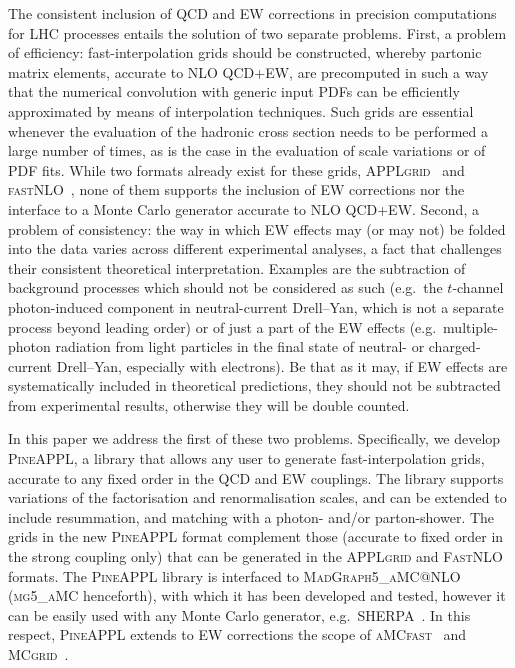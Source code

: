The consistent inclusion of QCD and EW corrections in precision computations for
LHC processes entails
the solution of two separate problems. First, a problem of efficiency:
fast-interpolation grids should be constructed, whereby partonic matrix 
elements, accurate to NLO QCD+EW, are precomputed in such a way that the 
numerical convolution with generic input PDFs can be efficiently approximated
by means of interpolation techniques. Such grids are essential
whenever the evaluation of the hadronic cross section needs to 
be performed a large number of times, as is the case in the evaluation of
scale variations or of PDF fits. While two formats already exist for
these grids, \textsc{APPLgrid}~\cite{Carli:2010rw} and
\textsc{fastNLO}~\cite{Kluge:2006xs,Wobisch:2011ij,Britzger:2012bs}, none of them supports the inclusion of EW
corrections nor the interface to a Monte Carlo generator accurate to 
NLO QCD+EW\@. Second, a problem of consistency: the way in which EW effects may
(or may not) be folded into the data varies across different experimental 
analyses, a fact that challenges their consistent theoretical interpretation. 
Examples are the subtraction of background processes which should not be 
considered as such (e.g.\ the $t$-channel photon-induced component in
neutral-current Drell--Yan, which is not a separate process beyond leading
order) or of just a part of the EW effects (e.g.\ multiple-photon
radiation from light particles in the final state of neutral- or charged-current
Drell--Yan, especially with electrons). Be that as it may, if EW effects are
systematically included in theoretical predictions, they should not be subtracted
from experimental results, otherwise they will be double counted.

In this paper we address the first of these two problems. Specifically, 
we develop \textsc{PineAPPL}, a library that allows any user to generate
fast-interpolation grids, accurate to any fixed order in the QCD and
EW couplings. The library supports variations of the factorisation
and renormalisation scales, and can be extended to include
resummation, and matching with a photon- and/or parton-shower.
The grids in the new \textsc{PineAPPL} format complement those
(accurate to fixed order in the strong coupling only) that can be generated
in the \textsc{APPLgrid} and \textsc{FastNLO} formats. The \textsc{PineAPPL}
library is interfaced to \textsc{MadGraph5\_aMC@NLO} (\textsc{mg5\_aMC}
henceforth), with which it has been developed and tested,
however it can be easily used with any Monte Carlo generator, 
e.g.\ \textsc{SHERPA}~\cite{Biedermann:2017yoi}. In this respect,
\textsc{PineAPPL} extends to EW corrections the scope of 
\textsc{aMCfast}~\cite{Bertone:2014zva} and
\textsc{MCgrid}~\cite{DelDebbio:2013kxa,Bothmann:2015dba}.

